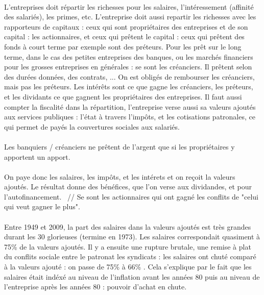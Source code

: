 \paragraph{} L'entreprises doit répartir les richesses pour les salaires, l'intéressement (affinité des salariés), les primes, etc. L'entreprise doit aussi repartir les richesses avec les rapporteurs de capitaux : ceux qui sont propriétaires des entreprises et de son capital : les actionnaires, et ceux qui prêtent le capital : ceux qui prêtent des fonds à court terme par exemple sont des préteurs. Pour les prêt sur le long terme, dans le cas des petites entreprises des banques, ou les marchés financiers pour les grosses entreprises en générales : se sont les créanciers. Il prêtent selon des durées données, des contrats, ... On est obligés de rembourser les créanciers, mais pas les préteurs. Les intérêts sont ce que gagne les créanciers, les préteurs, et les dividants ce que gagnent les propriétaires des entreprises. Il faut aussi compter la fiscalité dans la répartition, l'entreprise verse aussi sa valeurs ajoutés aux services publiques : l'état à travers l'impôts, et les cotisations patronales, ce qui permet de payés la couvertures sociales aux salariés.
\paragraph{} Les banquiers / créanciers ne prêtent de l'argent que si les propriétaires y apportent un apport.
\paragraph{} On paye donc les salaires, les impôts, et les intérets et on reçoit la valeurs ajoutés. Le résultat donne des bénéfices, que l'on verse aux dividandes, et pour l'autofinancement.
~//
Se sont les actionnaires qui ont gagné les conflits de "celui qui veut gagner le plus".
\paragraph{} Entre 1949 et 2009, la part des salaires dans la valeurs ajoutés est très grandes durant les 30 glorieuses (termine en 1973). Les salaires correspondait quasiment à 75\% de la valeurs ajoutés. Il y a ensuite une rupture brutale, une remise à plat du conflits sociale entre le patronat les syndicats : les salaires ont chuté comparé à la valeurs ajouté : on passe de 75\% à 66\% . Cela s'explique par le fait que les salaires était indéxé au niveau de l'inflation avant les années 80 puis au niveau de l'entreprise après les années 80 : pouvoir d'achat en chute.
